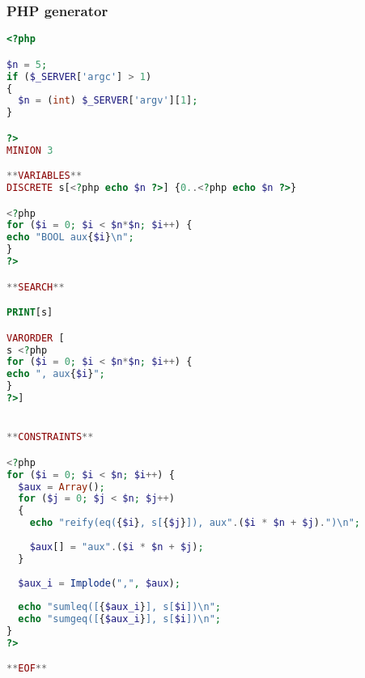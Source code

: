 \subsubsection{PHP generator}
\label{implementation:minion:ms:php}
\begin{lstlisting}[language=PHP]
<?php

$n = 5;
if ($_SERVER['argc'] > 1)
{
  $n = (int) $_SERVER['argv'][1];
}

?>
MINION 3

**VARIABLES**
DISCRETE s[<?php echo $n ?>] {0..<?php echo $n ?>}

<?php
for ($i = 0; $i < $n*$n; $i++) {
echo "BOOL aux{$i}\n";
}
?>

**SEARCH**

PRINT[s]

VARORDER [
s <?php
for ($i = 0; $i < $n*$n; $i++) {
echo ", aux{$i}";
}
?>]


**CONSTRAINTS**

<?php
for ($i = 0; $i < $n; $i++) {
  $aux = Array();
  for ($j = 0; $j < $n; $j++)
  {
    echo "reify(eq({$i}, s[{$j}]), aux".($i * $n + $j).")\n";
    
    $aux[] = "aux".($i * $n + $j);
  }
  
  $aux_i = Implode(",", $aux);
  
  echo "sumleq([{$aux_i}], s[$i])\n";
  echo "sumgeq([{$aux_i}], s[$i])\n";
}
?>

**EOF**
\end{lstlisting}